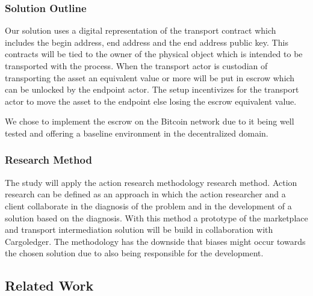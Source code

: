 
\subsubsection{Solution Outline}

Our solution uses a digital representation of the transport contract which includes the begin address, end address and the end address public key. This contracts will be tied to the owner of the physical object which is intended to be transported with the process. When the transport actor is custodian of transporting the asset an equivalent value or more will be put in escrow which can be unlocked by the endpoint actor. The setup incentivizes for the transport actor to move the asset to the endpoint else losing the escrow equivalent value. \par
We chose to implement the escrow on the Bitcoin network due to it being well tested and offering a baseline environment in the decentralized domain.

%

\subsubsection{Research Method}

The study will apply the action research methodology research method. Action research can be defined as an approach in which the action researcher and a client collaborate in the diagnosis of the problem and in the development of a solution based on the diagnosis. With this method a prototype of the marketplace and transport intermediation solution will be build in collaboration with Cargoledger. The methodology has the downside that biases might occur towards the chosen solution due to also being responsible for the development.\par

\subsection{Related Work}

